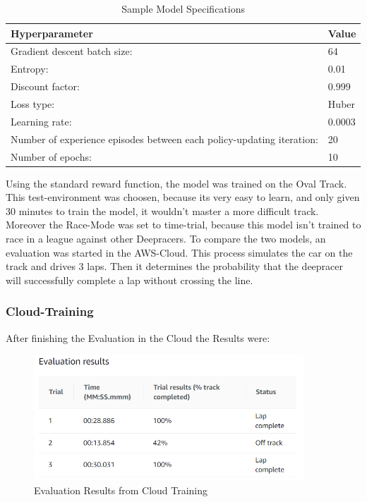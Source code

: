 \begin{table} [H]
\caption{Sample Model Specifications}
\label{Sample Model Specifications}
\centering
\begin{tabular}{|m{15em}|m{1cm}|}
\hline
\textbf{Hyperparameter} & \textbf{Value} \\
\hline
Gradient descent batch size: & 64 \\
\hline
Entropy: & 0.01 \\
\hline
Discount factor: & 0.999 \\
\hline
Loss type: & Huber \\
\hline
Learning rate: & 0.0003 \\
\hline
Number of experience episodes between each policy-updating iteration: & 20 \\
\hline
Number of epochs: & 10 \\
\hline
\end{tabular}
\end{table}

Using the standard reward function, the model was trained on the Oval Track. This test-environment was choosen, because its very easy to learn, and only given 30 minutes to train the model, it wouldn't master a more difficult track. Moreover the Race-Mode was set to time-trial, because this model isn't trained to race in a league against other Deepracers.
\newline
To compare the two models, an evaluation was started in the AWS-Cloud. This process simulates the car on the track and drives 3 laps. Then it determines the probability that the deepracer will successfully complete a lap without crossing the line.


\subsubsection{Cloud-Training}
After finishing the Evaluation in the Cloud the Results were:

\begin{figure}[H]
    \centering
    \includegraphics[width=0.9\textwidth]{images/CloudEvaluationResults.PNG}
    \caption[]{Evaluation Results from Cloud Training}
    \label{fig:evRe}
\end{figure}



